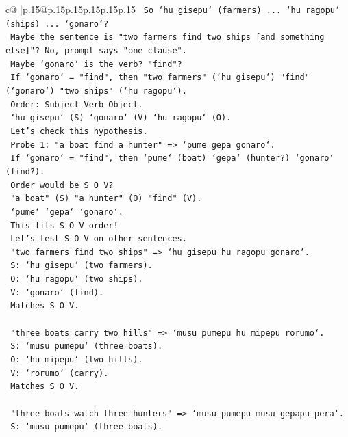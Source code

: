 \documentclass{article}
\begin{document}
{\begin{supertabular}{c@{$\;$}|p{.15\linewidth}@{}p{.15\linewidth}p{.15\linewidth}p{.15\linewidth}p{.15\linewidth}p{.15\linewidth}}
{{{\texttt{     So `hu gisepu` (farmers) ... `hu ragopu` (ships) ... `gonaro`?} \\
\texttt{     Maybe the sentence is "two farmers find two ships {[}and something else{]}"? No, prompt says "one clause".} \\
\texttt{     Maybe `gonaro` is the verb? "find"?} \\
\texttt{     If `gonaro` = "find", then "two farmers" (`hu gisepu`) "find" (`gonaro`) "two ships" (`hu ragopu`).} \\
\texttt{     Order: Subject Verb Object.} \\
\texttt{     `hu gisepu` (S) `gonaro` (V) `hu ragopu` (O).} \\
\texttt{     Let's check this hypothesis.} \\
\texttt{     Probe 1: "a boat find a hunter" => `pume gepa gonaro`.} \\
\texttt{     If `gonaro` = "find", then `pume` (boat) `gepa` (hunter?) `gonaro` (find?).} \\
\texttt{     Order would be S O V?} \\
\texttt{     "a boat" (S) "a hunter" (O) "find" (V).} \\
\texttt{     `pume` `gepa` `gonaro`.} \\
\texttt{     This fits S O V order!} \\
\texttt{     Let's test S O V on other sentences.} \\
\texttt{     "two farmers find two ships" => `hu gisepu hu ragopu gonaro`.} \\
\texttt{     S: `hu gisepu` (two farmers).} \\
\texttt{     O: `hu ragopu` (two ships).} \\
\texttt{     V: `gonaro` (find).} \\
\texttt{     Matches S O V.} \\
\\ 
\texttt{     "three boats carry two hills" => `musu pumepu hu mipepu rorumo`.} \\
\texttt{     S: `musu pumepu` (three boats).} \\
\texttt{     O: `hu mipepu` (two hills).} \\
\texttt{     V: `rorumo` (carry).} \\
\texttt{     Matches S O V.} \\
\\ 
\texttt{     "three boats watch three hunters" => `musu pumepu musu gepapu pera`.} \\
\texttt{     S: `musu pumepu` (three boats).} \\
}}}
\end{supertabular}}
\end{document}
